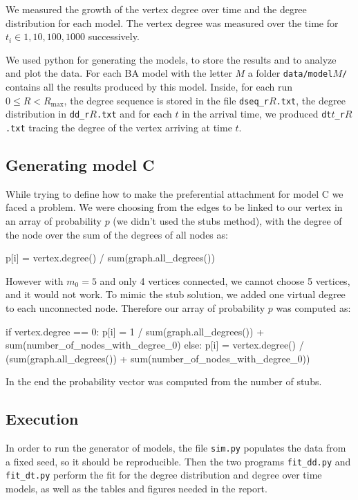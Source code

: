 \documentclass[a4paper]{article}
\begin{document}
We measured the growth of the vertex degree over time and the degree
distribution for each model. The vertex degree was measured over the time for
$t_i \in {1, 10, 100, 1000}$ successively.

We used python for generating the models, to store the results and to analyze
and plot the data. For each BA model with the letter $M$ a folder 
\texttt{data/model$M$/} contains all the results produced by this model.
Inside, for each run $0 \le R < R_{\max}$, the degree sequence is stored in the 
file \texttt{dseq\_r$R$.txt}, the degree distribution in \texttt{dd\_r$R$.txt} 
and for each $t$ in the arrival time, we produced \texttt{dt$t$\_r$R$.txt} 
tracing the degree of the vertex arriving at time $t$.

\subsection{Generating model C}

While trying to define how to make the preferential attachment for model C we
faced a problem. We were choosing from the edges to be linked to our vertex in
an array of probability $p$ (we didn't used the stubs method), with the degree
of the node over the sum of the degrees of all nodes as:
%
\begin{pycode}
p[i] = vertex.degree() / sum(graph.all_degrees())
\end{pycode}
%
However with $m_0 = 5$ and only 4 vertices  connected, we cannot choose 5
vertices, and it would not work. To mimic the stub solution, we added one
virtual degree to each unconnected node. Therefore our array of probability $p$
was computed as:
%
\begin{pycode}
if vertex.degree == 0:
	p[i] = 1 / sum(graph.all_degrees()) + sum(number_of_nodes_with_degree_0)
else:
	p[i] = vertex.degree() / (sum(graph.all_degrees()) +
		sum(number_of_nodes_with_degree_0))
\end{pycode}
%
In the end the probability vector was computed from the number of stubs.
%
\subsection{Execution}
%
In order to run the generator of models, the file \texttt{sim.py} populates the 
data from a fixed seed, so it should be reproducible. Then the two programs 
\texttt{fit\_dd.py} and \texttt{fit\_dt.py} perform the fit for the degree 
distribution and degree over time models, as well as the tables and figures 
needed in the report.
\end{document}
